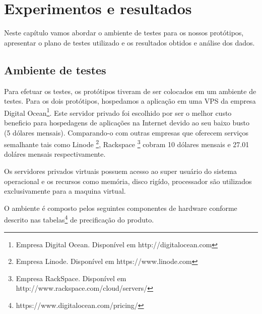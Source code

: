 
\chapter{Experimentos e resultados}
\label{experimentos-resultados}

\vspace{-1.9cm}


 Neste capítulo vamos abordar o ambiente de testes para os nossos protótipos, apresentar 
 o plano de testes utilizado e os resultados obtidos e análise dos dados.

\section{Ambiente de testes}
\label{ambientedetestes}

  Para efetuar os testes, os protótipos tiveram de ser colocados em um ambiente de testes. 
  Para os dois protótipos, hospedamos a aplicação em uma VPS da empresa Digital Ocean\footnote{Empresa Digital Ocean. Disponível em http://digitalocean.com}.
  Este servidor privado foi escolhido por ser o melhor custo beneficio para hospedagens de aplicações na Internet 
  devido ao seu baixo busto (5 dólares mensais). Comparando-o com outras empresas que oferecem serviços semalhante
  tais como Linode \footnote{Empresa Linode. Disponível em https://www.linode.com}, Rackspace \footnote{Empresa RackSpace. Disponível em http://www.rackspace.com/cloud/servers/}
  cobram 10 dólares mensais e 27.01 doláres mensais respectivamente.
  
  Os servidores privados virtuais possuem acesso ao super usuário do sistema operacional e os recursos como memória, disco rigído, processador
  são utilizados exclusivamente para a maquina virtual.
  
  O ambiente é composto pelos seguintes componentes de hardware conforme descrito nas tabelas\footnote{https://www.digitalocean.com/pricing/}
  de precificação do produto.
  
